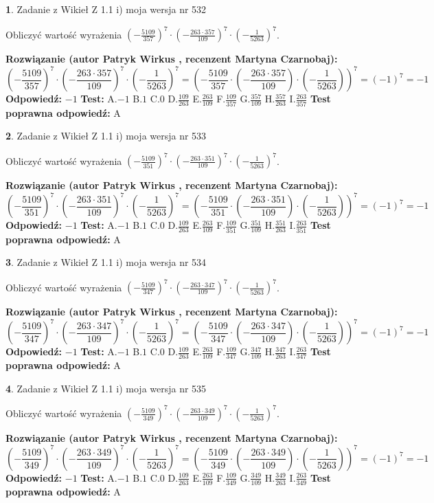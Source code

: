 \documentclass[12pt, a4paper]{article}
\theoremstyle{definition} %
\newtheorem{zad}{}
\newcommand{\zadStart}[1]{\begin{zad}#1\newline}
\newcommand{\zadStop}{\end{zad}}
\newcommand{\rozwStart}[2]{\noindent \textbf{Rozwiązanie (autor #1 , recenzent #2): }\newline}
\newcommand{\rozwStop}{\newline}
\newcommand{\odpStart}{\noindent \textbf{Odpowiedź:}\newline}
\newcommand{\odpStop}{\newline}
\newcommand{\testStart}{\noindent \textbf{Test:}\newline}
\newcommand{\testStop}{\newline}
\newcommand{\kluczStart}{\noindent \textbf{Test poprawna odpowiedź:}\newline}
\newcommand{\kluczStop}{\newline}
\begin{document}
\zadStart{Zadanie z Wikieł Z 1.1 i) moja wersja nr 532}

Obliczyć wartość wyrażenia $(-\frac{5109}{357})^{7} \cdot (-\frac{263 \cdot 357}{109})^{7} \cdot (-\frac{1}{5263})^{7}$.
\zadStop
\rozwStart{Patryk Wirkus}{Martyna Czarnobaj}
$$(-\frac{5109}{357})^{7} \cdot (-\frac{263 \cdot 357}{109})^{7} \cdot (-\frac{1}{5263})^{7} = (-\frac{5109}{357} \cdot (-\frac{263 \cdot 357}{109}) \cdot (-\frac{1}{5263}))^{7} = (-1)^{7} = -1$$
\rozwStop
\odpStart
$-1$
\odpStop
\testStart
A.$-1$ B.$1$ C.$0$ D.$\frac{109}{263}$ E.$\frac{263}{109}$
F.$\frac{109}{357}$ G.$\frac{357}{109}$
H.$\frac{357}{263}$
I.$\frac{263}{357}$
\testStop
\kluczStart
A
\kluczStop



\zadStart{Zadanie z Wikieł Z 1.1 i) moja wersja nr 533}

Obliczyć wartość wyrażenia $(-\frac{5109}{351})^{7} \cdot (-\frac{263 \cdot 351}{109})^{7} \cdot (-\frac{1}{5263})^{7}$.
\zadStop
\rozwStart{Patryk Wirkus}{Martyna Czarnobaj}
$$(-\frac{5109}{351})^{7} \cdot (-\frac{263 \cdot 351}{109})^{7} \cdot (-\frac{1}{5263})^{7} = (-\frac{5109}{351} \cdot (-\frac{263 \cdot 351}{109}) \cdot (-\frac{1}{5263}))^{7} = (-1)^{7} = -1$$
\rozwStop
\odpStart
$-1$
\odpStop
\testStart
A.$-1$ B.$1$ C.$0$ D.$\frac{109}{263}$ E.$\frac{263}{109}$
F.$\frac{109}{351}$ G.$\frac{351}{109}$
H.$\frac{351}{263}$
I.$\frac{263}{351}$
\testStop
\kluczStart
A
\kluczStop



\zadStart{Zadanie z Wikieł Z 1.1 i) moja wersja nr 534}

Obliczyć wartość wyrażenia $(-\frac{5109}{347})^{7} \cdot (-\frac{263 \cdot 347}{109})^{7} \cdot (-\frac{1}{5263})^{7}$.
\zadStop
\rozwStart{Patryk Wirkus}{Martyna Czarnobaj}
$$(-\frac{5109}{347})^{7} \cdot (-\frac{263 \cdot 347}{109})^{7} \cdot (-\frac{1}{5263})^{7} = (-\frac{5109}{347} \cdot (-\frac{263 \cdot 347}{109}) \cdot (-\frac{1}{5263}))^{7} = (-1)^{7} = -1$$
\rozwStop
\odpStart
$-1$
\odpStop
\testStart
A.$-1$ B.$1$ C.$0$ D.$\frac{109}{263}$ E.$\frac{263}{109}$
F.$\frac{109}{347}$ G.$\frac{347}{109}$
H.$\frac{347}{263}$
I.$\frac{263}{347}$
\testStop
\kluczStart
A
\kluczStop



\zadStart{Zadanie z Wikieł Z 1.1 i) moja wersja nr 535}

Obliczyć wartość wyrażenia $(-\frac{5109}{349})^{7} \cdot (-\frac{263 \cdot 349}{109})^{7} \cdot (-\frac{1}{5263})^{7}$.
\zadStop
\rozwStart{Patryk Wirkus}{Martyna Czarnobaj}
$$(-\frac{5109}{349})^{7} \cdot (-\frac{263 \cdot 349}{109})^{7} \cdot (-\frac{1}{5263})^{7} = (-\frac{5109}{349} \cdot (-\frac{263 \cdot 349}{109}) \cdot (-\frac{1}{5263}))^{7} = (-1)^{7} = -1$$
\rozwStop
\odpStart
$-1$
\odpStop
\testStart
A.$-1$ B.$1$ C.$0$ D.$\frac{109}{263}$ E.$\frac{263}{109}$
F.$\frac{109}{349}$ G.$\frac{349}{109}$
H.$\frac{349}{263}$
I.$\frac{263}{349}$
\testStop
\kluczStart
A
\kluczStop
\end{document}
